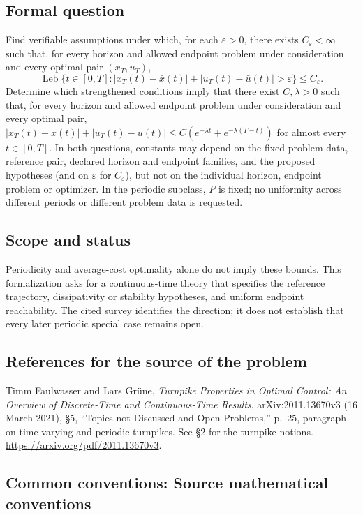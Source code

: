 \documentclass[11pt,a4paper]{article}
\begin{document}
\subsection*{Formal question}
Find verifiable assumptions under which, for each $\varepsilon>0$, there
exists $C_\varepsilon<\infty$ such that, for every horizon and allowed
endpoint problem under consideration and every optimal pair $(x_T,u_T)$,
\[
 \operatorname{Leb}\{t\in[0,T]:
 |x_T(t)-\bar x(t)|+|u_T(t)-\bar u(t)|>\varepsilon\}
 \leq C_\varepsilon.
\]
Determine which strengthened conditions imply that there exist
$C,\lambda>0$ such that, for every horizon and allowed endpoint problem
under consideration and every optimal pair,
$|x_T(t)-\bar x(t)|+|u_T(t)-\bar u(t)|
\leq C(e^{-\lambda t}+e^{-\lambda(T-t)})$ for almost every $t\in[0,T]$.
In both questions, constants may depend on the fixed problem data,
reference pair, declared horizon and endpoint families, and the proposed
hypotheses (and on $\varepsilon$ for $C_\varepsilon$), but not on the
individual horizon, endpoint problem or optimizer. In the periodic subclass,
$P$ is fixed; no uniformity across different periods or different problem
data is requested.
\subsection*{Scope and status}
Periodicity and average-cost optimality alone do not imply these bounds.
This formalization asks for a continuous-time theory that specifies the
reference trajectory, dissipativity or stability hypotheses, and uniform
endpoint reachability. The cited survey identifies the direction; it
does not establish that every later periodic special case remains open.
\subsection*{References for the source of the problem}
Timm Faulwasser and Lars Gr\"une, \emph{Turnpike Properties in Optimal
Control: An Overview of Discrete-Time and Continuous-Time Results},
arXiv:2011.13670v3 (16 March 2021), \S5, ``Topics not Discussed and
Open Problems,'' p.~25, paragraph on time-varying and periodic turnpikes.
See \S2 for the turnpike notions.
\url{https://arxiv.org/pdf/2011.13670v3}.

\subsection*{Common conventions: Source mathematical conventions}
\end{document}
